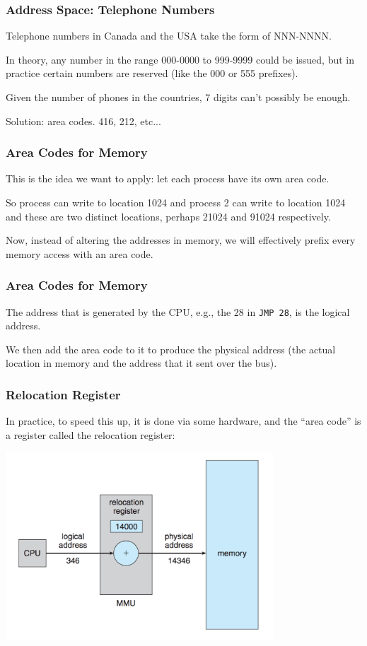 \begin{frame}
\frametitle{Address Space: Telephone Numbers}
Telephone numbers in Canada and the USA take the form of NNN-NNNN.

In theory, any number in the range 000-0000 to 999-9999 could be issued, but in practice certain numbers are reserved (like the 000 or 555 prefixes).

Given the number of phones in the countries, 7 digits can't possibly be enough.

Solution: area codes. 416, 212, etc...

\end{frame}

\begin{frame}
\frametitle{Area Codes for Memory}

This is the idea we want to apply: let each process have its own area code. 

So process can write to location 1024 and process 2 can write to location 1024 and these are two distinct locations, perhaps 21024 and 91024 respectively.

Now, instead of altering the addresses in memory, we will effectively prefix every memory access with an area code.

\end{frame}

\begin{frame}
\frametitle{Area Codes for Memory}

The address that is generated by the CPU, e.g., the 28 in \texttt{JMP 28}, is the \alert{logical address}. 

We then add the area code to it to produce the \alert{physical address} (the actual location in memory and the address that it sent over the bus). 


\end{frame}

\begin{frame}
\frametitle{Relocation Register}

In practice, to speed this up, it is done via some hardware, and the ``area code'' is a register called the \alert{relocation register}:

\begin{center}
\includegraphics[width=0.75\textwidth]{images/relocation-register.png}
\end{center}



\end{frame}

